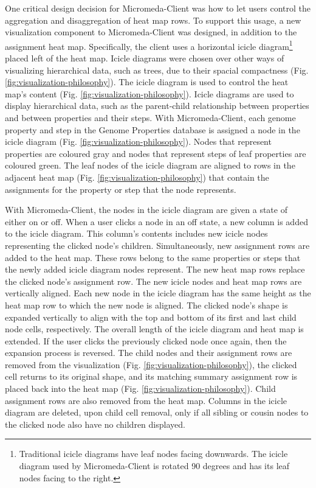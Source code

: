 One critical design decision for Micromeda-Client was how to let users control 
the aggregation and disaggregation of heat map rows. To support this 
usage, a new visualization component to Micromeda-Client was designed, in 
addition to the assignment heat map. Specifically, the client uses a horizontal 
icicle diagram\footnote{Traditional icicle diagrams have leaf nodes facing 
downwards. The icicle diagram used by Micromeda-Client is rotated 90 degrees and 
has its leaf nodes facing to the right.} placed left of the heat map. Icicle 
diagrams were chosen over other ways of visualizing hierarchical data, such as 
trees, due to their spacial compactness (Fig. 
\ref{fig:visualization-philosophy}). The icicle diagram is used to control the 
heat map's content (Fig. \ref{fig:visualization-philosophy}). Icicle diagrams 
are used to display hierarchical data, such as the parent-child relationship 
between properties and between properties and their steps. With 
Micromeda-Client, each genome property and step in the Genome Properties 
database is assigned a node in the icicle diagram (Fig. 
\ref{fig:visualization-philosophy}). Nodes that represent properties are 
coloured gray and nodes that represent steps of leaf properties are coloured 
green. The leaf nodes of the icicle diagram are aligned to rows in the adjacent 
heat map (Fig. \ref{fig:visualization-philosophy}) that contain the assignments 
for the property or step that the node represents.

With Micromeda-Client, the nodes in the icicle diagram are given a state of 
either on or off. When a user clicks a node in an off state, a new column is 
added to the icicle diagram. This column's contents includes new icicle nodes 
representing the clicked node's children. Simultaneously, new assignment rows 
are added to the heat map. These rows belong to the same properties or steps 
that the newly added icicle diagram nodes represent. The new heat map rows 
replace the clicked node's assignment row. The new icicle nodes and heat map 
rows are vertically aligned. Each new node in the icicle diagram has the same 
height as the heat map row to which the new node is aligned. The clicked node's 
shape is expanded vertically to align with the top and bottom of its first and 
last child node cells, respectively. The overall length of the icicle diagram 
and heat map is extended. If the user clicks the previously clicked node once 
again, then the expansion process is reversed. The child nodes and their 
assignment rows are removed from the visualization (Fig. 
\ref{fig:visualization-philosophy}), the clicked cell returns to its original 
shape, and its matching summary assignment row is placed back into the heat map 
(Fig. \ref{fig:visualization-philosophy}). Child assignment rows are also 
removed from the heat map. Columns in the icicle diagram are deleted, upon child 
cell removal, only if all sibling or cousin nodes to the clicked node also have 
no children displayed.

